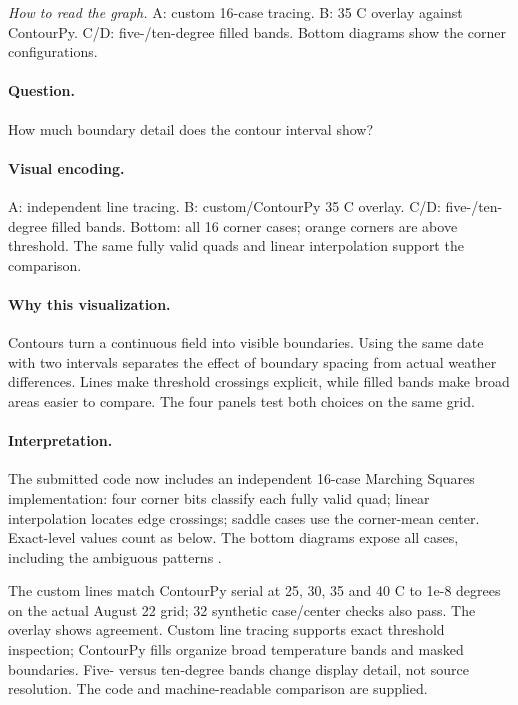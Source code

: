 \documentclass[conference,a4paper]{IEEEtran}
\begin{document}
\noindent\textit{How to read the graph.} A: custom 16-case tracing. B: 35 C overlay against ContourPy. C/D: five-/ten-degree filled bands. Bottom diagrams show the corner configurations.

\paragraph{Question.} How much boundary detail does the contour interval show?



\paragraph{Visual encoding.} A: independent line tracing. B: custom/ContourPy 35 C overlay. C/D: five-/ten-degree filled bands. Bottom: all 16 corner cases; orange corners are above threshold. The same fully valid quads and linear interpolation support the comparison.



\paragraph{Why this visualization.} Contours turn a continuous field into visible boundaries. Using the same date with two intervals separates the effect of boundary spacing from actual weather differences. Lines make threshold crossings explicit, while filled bands make broad areas easier to compare. The four panels test both choices on the same grid.



\paragraph{Interpretation.} The submitted code now includes an independent 16-case Marching Squares implementation: four corner bits classify each fully valid quad; linear interpolation locates edge crossings; saddle cases use the corner-mean center. Exact-level values count as below. The bottom diagrams expose all cases, including the ambiguous patterns \cite{ref6}.

The custom lines match ContourPy serial at 25, 30, 35 and 40 C to 1e-8 degrees on the actual August 22 grid; 32 synthetic case/center checks also pass. The overlay shows agreement. Custom line tracing supports exact threshold inspection; ContourPy fills organize broad temperature bands and masked boundaries. Five- versus ten-degree bands change display detail, not source resolution. The code and machine-readable comparison are supplied.
\end{document}
